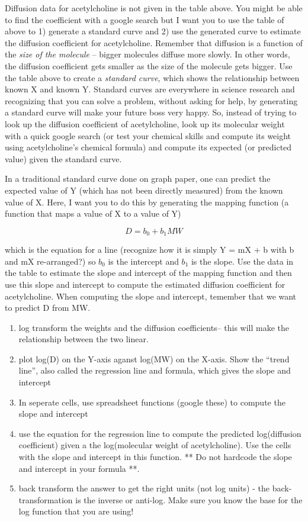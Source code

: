 \documentclass[]{book}
\providecommand{\tightlist}{%
  \setlength{\itemsep}{0pt}\setlength{\parskip}{0pt}}
\begin{document}
Diffusion data for acetylcholine is not given in the table above. You
might be able to find the coefficient with a google search but I want
you to use the table of above to 1) generate a standard curve and 2) use
the generated curve to estimate the diffusion coefficient for
acetylcholine. Remember that diffusion is a function of the \emph{size
of the molecule} -- bigger molecules diffuse more slowly. In other
words, the diffusion coefficient gets smaller as the size of the
molecule gets bigger. Use the table above to create a \emph{standard
curve}, which shows the relationship between known X and known Y.
Standard curves are everywhere in science research and recognizing that
you can solve a problem, without asking for help, by generating a
standard curve will make your future boss very happy. So, instead of
trying to look up the diffusion coefficient of acetylcholine, look up
its molecular weight with a quick google search (or test your chemical
skills and compute its weight using acetylcholine's chemical formula)
and compute its expected (or predicted value) given the standard curve.

In a traditional standard curve done on graph paper, one can predict the
expected value of Y (which has not been directly measured) from the
known value of X. Here, I want you to do this by generating the mapping
function (a function that maps a value of X to a value of Y)

\begin{equation}
D = b_0 + b_1 MW
\end{equation}

which is the equation for a line (recognize how it is simply Y = mX + b
with b and mX re-arranged?) so \(b_0\) is the intercept and \(b_1\) is
the slope. Use the data in the table to estimate the slope and intercept
of the mapping function and then use this slope and intercept to compute
the estimated diffusion coefficient for acetylcholine. When computing
the slope and intercept, temember that we want to predict D from MW.

\begin{enumerate}
\def\labelenumi{\arabic{enumi}.}
\tightlist
\item
  log transform the weights and the diffusion coefficients-- this will
  make the relationship between the two linear.
\item
  plot log(D) on the Y-axis aganst log(MW) on the X-axis. Show the
  ``trend line'', also called the regression line and formula, which
  gives the slope and intercept
\item
  In seperate cells, use spreadsheet functions (google these) to compute
  the slope and intercept
\item
  use the equation for the regression line to compute the predicted
  log(diffusion coefficient) given a the log(molecular weight of
  acetylcholine). Use the cells with the slope and intercept in this
  function. ** Do not hardcode the slope and intercept in your formula
  **.
\item
  back transform the answer to get the right units (not log units) - the
  back-transformation is the inverse or anti-log. Make sure you know the
  base for the log function that you are using!
\end{enumerate}
\end{document}
